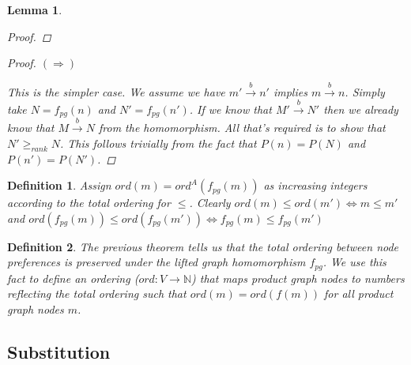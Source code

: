\documentclass[twocolumn, openany]{sig-alternate-10pt}
\newtheorem{defn}{Definition}
\newtheorem{lem}[thm]{Lemma}
\begin{document}
\begin{lem}
\begin{proof}
  \end{proof}

  \begin{proof}
    $(\Rightarrow)$

    This is the simpler case. We assume we have $m' \overset{b}{\rightarrow} n'$ implies $m \overset{b}{\rightarrow} n$.
    Simply take $N = f_{pg}(n)$ and $N' = f_{pg}(n')$. If we know that $M' \overset{b}{\rightarrow} N'$ then we already know that $M \overset{b}{\rightarrow} N$ from the homomorphism. All that's required is to show that $N' \geq_{rank} N$. This follows trivially from the fact that $P(n) = P(N)$ and $P(n') = P(N')$.
  \end{proof}

\end{lem}

\vspace{1em}
\begin{defn}
  Assign $ord(m) = ord^A(f_{pg}(m))$ as increasing integers according to the total ordering for $\leq$.
  Clearly $ord(m) \leq ord(m') \iff m \leq m'$ and $ord(f_{pg}(m)) \leq ord(f_{pg}(m')) \iff f_{pg}(m) \leq f_{pg}(m')$
\end{defn}

\vspace{1em}
\begin{defn}
  The previous theorem tells us that the total ordering between node preferences is preserved under the lifted graph homomorphism $f_{pg}$. 
  We use this fact to define an ordering ($ord : V \rightarrow \mathbb{N}$) that maps product graph nodes to numbers reflecting the total ordering such that $ord(m) = ord(f(m))$ for all product graph nodes $m$.
\end{defn} 


\vspace{1em}
\subsection{Substitution}
\end{document}

